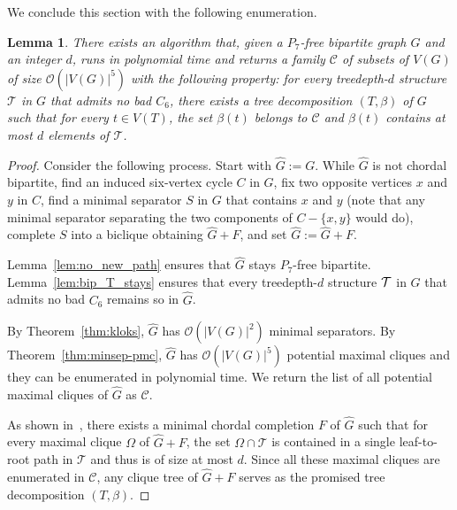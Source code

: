 \documentclass[11pt,a4paper]{article}
\newtheorem{lemma}[theorem]{Lemma}
\theoremstyle{definition}
\newcommand{\Oh}{\mathcal{O}}
\def\T{\mathcal{T}}
\begin{document}
We conclude this section with the following enumeration. 
\begin{lemma}\label{lem:bip-alg-no-bad-C6}
There exists an algorithm that, given 
a $P_7$-free bipartite graph $G$ and an integer $d$,
runs in polynomial time and returns a
family $\mathcal{C}$ of subsets of $V(G)$ of size $\Oh(|V(G)|^5)$
with the following property:
for every treedepth-$d$ structure $\T$ in $G$ that admits no bad $C_6$,
there exists a tree decomposition $(T,\beta)$ of $G$
such that for every $t \in V(T)$, the set $\beta(t)$ belongs to $\mathcal{C}$
and $\beta(t)$ contains at most $d$ elements of $\T$.
\end{lemma}
\begin{proof}
Consider the following process. Start with $\widehat{G} := G$.
While $\widehat{G}$ is not chordal bipartite, find an induced six-vertex cycle $C$ in $G$, fix two opposite vertices $x$ and $y$ in $C$, find a minimal separator $S$ in $G$ that contains $x$ and $y$ (note that any minimal separator separating the two components of $C-\{x,y\}$ would do),
complete $S$ into a biclique obtaining $\widehat{G}+F$, and set $\widehat{G} := \widehat{G} + F$. 

Lemma~\ref{lem:no_new_path} ensures that $\widehat{G}$ stays $P_7$-free bipartite.
Lemma~\ref{lem:bip_T_stays} ensures that every treedepth-$d$ structure ${\cal T}$ in $G$ that admits no bad $C_6$ remains so in $\widehat{G}$.

By Theorem~\ref{thm:kloks}, $\widehat{G}$ has $\Oh(|V(G)|^2)$ minimal separators. 
By Theorem~\ref{thm:minsep-pmc}, $\widehat{G}$ has $\Oh(|V(G)|^5)$ potential maximal cliques
and they can be enumerated in polynomial time. We return the list of all potential
maximal cliques of $\widehat{G}$ as $\mathcal{C}$.

As shown in~\cite{DBLP:conf/soda/ChudnovskyMPPR24}, there exists a minimal chordal completion $F$ of $\widehat{G}$
such that for every maximal clique $\Omega$ of $\widehat{G}+F$, the set $\Omega \cap \T$
is contained in a single leaf-to-root path in $\T$ and thus is of size at most $d$. 
Since all these maximal cliques are enumerated in $\mathcal{C}$, any clique
tree of $\widehat{G}+F$ serves as the promised tree decomposition $(T,\beta)$. 
\end{proof}
\end{document}
